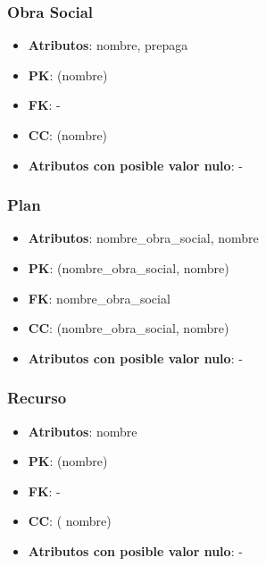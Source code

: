 \documentclass[a4paper,11pt]{article}
\begin{document}
\subsubsection{\textbf{Obra Social}}

\begin{itemize}

\item 
\textbf{Atributos}: nombre, prepaga

\item 
\textbf{PK}: (nombre)

\item
\textbf{FK}: -

\item 
\textbf{CC}: (nombre)

\item 
\textbf{Atributos con posible valor nulo}: -

\end{itemize}

\subsubsection{\textbf{Plan}}

\begin{itemize}

\item 
\textbf{Atributos}: nombre\_obra\_social, nombre

\item 
\textbf{PK}: (nombre\_obra\_social, nombre)

\item
\textbf{FK}: nombre\_obra\_social

\item 
\textbf{CC}: (nombre\_obra\_social, nombre)

\item 
\textbf{Atributos con posible valor nulo}: -

\end{itemize}
\subsubsection{\textbf{Recurso}}

\begin{itemize}

\item 
\textbf{Atributos}: nombre

\item 
\textbf{PK}: (nombre)

\item
\textbf{FK}: -

\item 
\textbf{CC}: ( nombre)

\item 
\textbf{Atributos con posible valor nulo}: -

\end{itemize}
\end{document}

